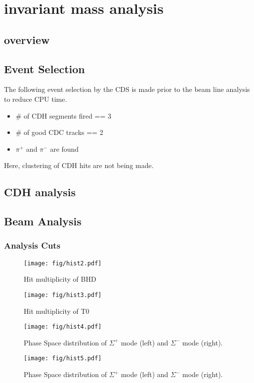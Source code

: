 \section{ \reaction invariant mass analysis}
\subsection{overview}


\subsection{Event Selection}
The following event selection by the CDS is made prior to the beam line analysis to reduce CPU time.
\begin{itemize}
\item \# of CDH segments fired == 3
\item \# of good CDC tracks == 2
\item $\pi^+$ and $\pi^-$ are found
\end{itemize}
Here, clustering of CDH hits are not being made.

\subsection{CDH analysis}





\subsection{Beam Analysis}
\subsubsection{Analysis Cuts}

\begin{figure}
\texttt{[image: fig/hist2.pdf]}
\caption{Hit multiplicity of BHD}
\end{figure}
\begin{figure}
\texttt{[image: fig/hist3.pdf]}
\caption{Hit multiplicity of T0}
\end{figure}


\begin{figure}
\texttt{[image: fig/hist4.pdf]}
\caption{Phase Space distribution of $\Sigma^+$ mode (left) and $\Sigma^-$ mode (right).}
\end{figure}

\begin{figure}
\texttt{[image: fig/hist5.pdf]}
\caption{Phase Space distribution of $\Sigma^+$ mode (left) and $\Sigma^-$ mode (right).}
\end{figure}


